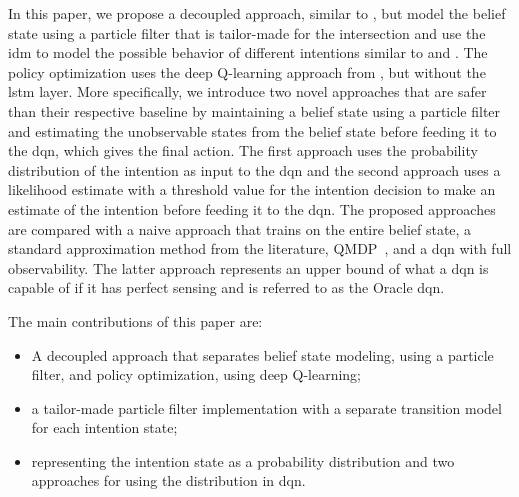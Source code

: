 In this paper, we propose a decoupled approach, similar to \cite{wang2023}, but model the belief state using a particle filter that is tailor-made for the intersection and use the \gls{idm} to model the possible behavior of different intentions similar to \cite{Liebner2012} and \cite{Hoermann2017}. The policy optimization uses the deep Q-learning approach from \cite{Tram2018}, but without the \gls{lstm} layer.
More specifically, we introduce two novel approaches that are safer than their respective baseline by maintaining a belief state using a particle filter and estimating the unobservable states from the belief state before feeding it to the \gls{dqn}, which gives the final action. 
The first approach uses the probability distribution of the intention as input to the \gls{dqn} and the second approach uses a likelihood estimate with a threshold value for the intention decision to make an estimate of the intention before feeding it to the \gls{dqn}.
The proposed approaches are compared with a naive approach that trains on the entire belief state, a standard approximation method from the literature, QMDP~\cite{Littman1995}, and a \gls{dqn} with full observability. The latter approach represents an upper bound of what a \gls{dqn} is capable of if it has perfect sensing and is referred to as the Oracle \gls{dqn}. 

The main contributions of this paper are: 
\begin{itemize}
    \item A decoupled approach that separates belief state modeling, using a particle filter, and policy optimization, using deep Q-learning; 
    \item a tailor-made particle filter implementation with a separate transition model for each intention state;
    \item representing the intention state as a probability distribution and two approaches for using the distribution in \gls{dqn}.   
    
\end{itemize}



